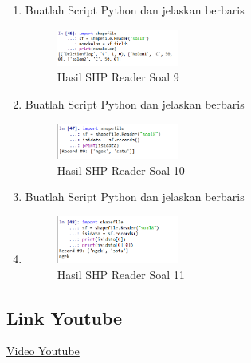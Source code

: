 \begin{enumerate}
    \item Buatlah Script Python dan jelaskan berbaris
    
    \hfill\break
    \begin{figure}[H]
		\includegraphics[width=4cm]{figures/1174026/3/9.png}
		\centering
		\caption{Hasil SHP Reader Soal 9}
    \end{figure}

    \item Buatlah Script Python dan jelaskan berbaris
    
    \hfill\break
    \begin{figure}[H]
		\includegraphics[width=4cm]{figures/1174026/3/10.png}
		\centering
		\caption{Hasil SHP Reader Soal 10}
    \end{figure}

    \item Buatlah Script Python dan jelaskan berbaris
    \item 
    \hfill\break
    \begin{figure}[H]
		\includegraphics[width=4cm]{figures/1174026/3/11.png}
		\centering
		\caption{Hasil SHP Reader Soal 11}
    \end{figure}
\end{enumerate}
\subsection{Link Youtube}
\href{https://youtu.be/yQ1O-FrBygA}{Video Youtube}